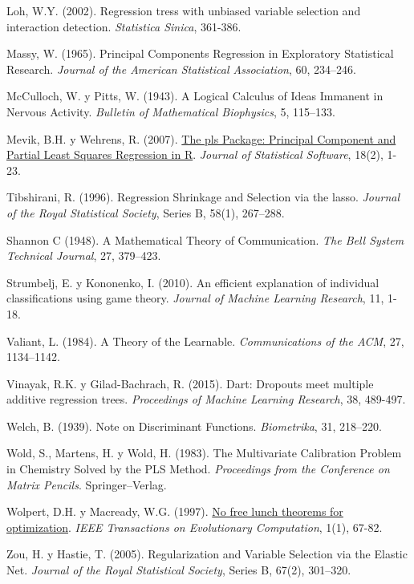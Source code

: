 \documentclass[
]{book}
\theoremstyle{break}
\theoremstyle{definition}
\theoremstyle{definition}
\theoremstyle{definition}
\theoremstyle{definition}
\theoremstyle{remark}
\begin{document}
Loh, W.Y. (2002). Regression tress with unbiased variable selection and interaction detection. \emph{Statistica Sinica}, 361-386.

Massy, W. (1965). Principal Components Regression in Exploratory Statistical Research. \emph{Journal of the American Statistical Association}, 60, 234--246.

McCulloch, W. y Pitts, W. (1943). A Logical Calculus of Ideas Immanent in Nervous Activity. \emph{Bulletin of Mathematical Biophysics}, 5, 115--133.

Mevik, B.H. y Wehrens, R. (2007). \href{https://www.jstatsoft.org/article/view/v018i02}{The pls Package: Principal Component and Partial Least Squares Regression in R}. \emph{Journal of Statistical Software}, 18(2), 1-23.

Tibshirani, R. (1996). Regression Shrinkage and Selection via the lasso. \emph{Journal of the Royal Statistical Society}, Series B, 58(1), 267--288.

Shannon C (1948). A Mathematical Theory of Communication. \emph{The Bell System Technical Journal}, 27, 379--423.

Strumbelj, E. y Kononenko, I. (2010). An efficient explanation of individual classifications using game theory. \emph{Journal of Machine Learning Research}, 11, 1-18.

Valiant, L. (1984). A Theory of the Learnable. \emph{Communications of the ACM}, 27, 1134--1142.

Vinayak, R.K. y Gilad-Bachrach, R. (2015). Dart: Dropouts meet multiple additive regression trees. \emph{Proceedings of Machine Learning Research}, 38, 489-497.

Welch, B. (1939). Note on Discriminant Functions. \emph{Biometrika}, 31, 218--220.

Wold, S., Martens, H. y Wold, H. (1983). The Multivariate Calibration Problem in Chemistry Solved by the PLS Method. \emph{Proceedings from the Conference on Matrix Pencils}. Springer--Verlag.

Wolpert, D.H. y Macready, W.G. (1997). \href{https://ieeexplore.ieee.org/abstract/document/585893?casa_token=IHZIcIuLxFEAAAAA:yKn2cFuhdh2S6Liw1otdqZAhCcVyFFwwk9LxwMEn_deuWO5i2n1uAOvTYdeFbh6cEJuXTPdkDQ}{No free lunch theorems for optimization}. \emph{IEEE Transactions on Evolutionary Computation}, 1(1), 67-82.

Zou, H. y Hastie, T. (2005). Regularization and Variable Selection via the Elastic Net. \emph{Journal of the Royal Statistical Society}, Series B, 67(2), 301--320.

  
\end{document}
